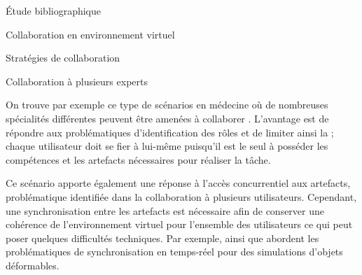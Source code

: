 \documentclass[myfrancais,ngerman,english,french]{mythesis}
\begin{document}
\begin{mychapter}{Étude bibliographique}
\begin{mysection}{Collaboration en environnement virtuel}
\begin{mysubsection}{Stratégies de collaboration}
\begin{mysubsubsection}{Collaboration à plusieurs experts}
\begin{myfigure}
\begin{myps}
							\ncput*[npos=1.5]{\myGrounding}
						\end{myps}
						\let\arraystretch\oldarraystretch
					\end{myfigure}

					On trouve par exemple ce type de scénarios en médecine où de nombreuses spécialités différentes peuvent être amenées à collaborer .
					L'avantage est de répondre aux problématiques d'identification des rôles et de limiter ainsi la ; chaque utilisateur doit se fier à lui-même puisqu'il est le seul à posséder les compétences et les artefacts nécessaires pour réaliser la tâche.

					Ce scénario apporte également une réponse à l'accès concurrentiel aux artefacts, problématique identifiée dans la collaboration à plusieurs utilisateurs.
					Cependant, une synchronisation entre les artefacts est nécessaire afin de conserver une cohérence de l'environnement virtuel pour l'ensemble des utilisateurs ce qui peut poser quelques difficultés techniques.
					Par exemple,  ainsi que  abordent les problématiques de synchronisation en temps-réel pour des simulations d'objets déformables.


\end{mysubsubsection}
\end{mysubsection}
\end{mysection}
\end{mychapter}
\end{document}
